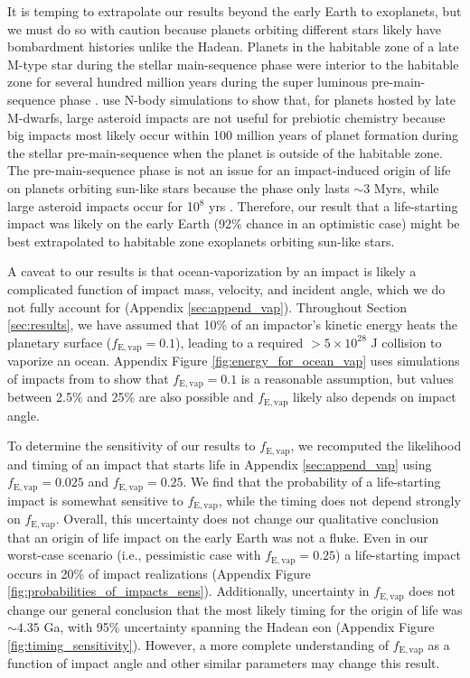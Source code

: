 \documentclass[manuscript]{aastex63}
\begin{document}
It is temping to extrapolate our results beyond the early Earth to exoplanets, but we must do so with caution because planets orbiting different stars likely have bombardment histories unlike the Hadean. Planets in the habitable zone of a late M-type star during the stellar main-sequence phase were interior to the habitable zone for several hundred million years during the super luminous pre-main-sequence phase \citep{Luger_2015}. \citet{Lichtenberg_2022} use N-body simulations to show that, for planets hosted by late M-dwarfs, large asteroid impacts are not useful for prebiotic chemistry because big impacts most likely occur within 100 million years of planet formation during the stellar pre-main-sequence when the planet is outside of the habitable zone. The pre-main-sequence phase is not an issue for an impact-induced origin of life on planets orbiting sun-like stars because the phase only lasts $\sim 3$ Myrs, while large asteroid impacts occur for 10$^8$ yrs \citep{Lichtenberg_2022}. Therefore, our result that a life-starting impact was likely on the early Earth (92\% chance in an optimistic case) might be best extrapolated to habitable zone exoplanets orbiting sun-like stars.

A caveat to our results is that ocean-vaporization by an impact is likely a complicated function of impact mass, velocity, and incident angle, which we do not fully account for (Appendix \ref{sec:append_vap}). Throughout Section \ref{sec:results}, we have assumed that 10\% of an impactor's kinetic energy heats the planetary surface ($f_\mathrm{E,vap} = 0.1$), leading to a required $> 5 \times 10^{28}$ J collision to vaporize an ocean. Appendix Figure \ref{fig:energy_for_ocean_vap} uses simulations of impacts from \citet{Citron_2022} to show that $f_\mathrm{E,vap} = 0.1$ is a reasonable assumption, but values between 2.5\% and 25\% are also possible and $f_\mathrm{E,vap}$ likely also depends on impact angle.

To determine the sensitivity of our results to $f_\mathrm{E,vap}$, we recomputed the likelihood and timing of an impact that starts life in Appendix \ref{sec:append_vap} using $f_\mathrm{E,vap} = 0.025$ and $f_\mathrm{E,vap} = 0.25$. We find that the probability of a life-starting impact is somewhat sensitive to $f_\mathrm{E,vap}$, while the timing does not depend strongly on $f_\mathrm{E,vap}$. Overall, this uncertainty does not change our qualitative conclusion that an origin of life impact on the early Earth was not a fluke. Even in our worst-case scenario (i.e., \citet{Wogan_2023} pessimistic case with $f_\mathrm{E,vap} = 0.25$) a life-starting impact occurs in 20\% of impact realizations (Appendix Figure \ref{fig:probabilities_of_impacts_sens}). Additionally, uncertainty in $f_\mathrm{E,vap}$ does not change our general conclusion that the most likely timing for the origin of life was $\sim 4.35$ Ga, with 95\% uncertainty spanning the Hadean eon (Appendix Figure \ref{fig:timing_sensitivity}). However, a more complete understanding of $f_\mathrm{E,vap}$ as a function of impact angle and other similar parameters may change this result.
\end{document}
